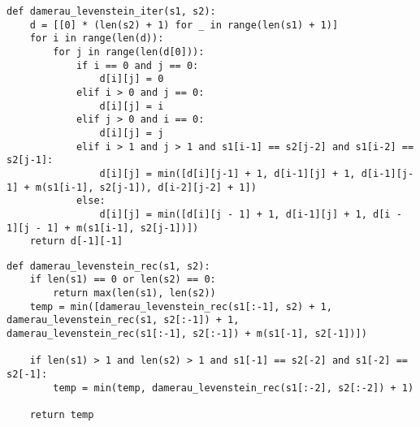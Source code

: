 \clearpage

\begin{lstlisting}[label=lst:dameray_lev_rec,caption=Функция нахождения расстояния Дамерау-Левенштейна с использованием матрицы]
def damerau_levenstein_iter(s1, s2):
	d = [[0] * (len(s2) + 1) for _ in range(len(s1) + 1)]
	for i in range(len(d)):
		for j in range(len(d[0])):
			if i == 0 and j == 0:
				d[i][j] = 0
			elif i > 0 and j == 0:
				d[i][j] = i
			elif j > 0 and i == 0:
				d[i][j] = j
			elif i > 1 and j > 1 and s1[i-1] == s2[j-2] and s1[i-2] == s2[j-1]:
				d[i][j] = min([d[i][j-1] + 1, d[i-1][j] + 1, d[i-1][j-1] + m(s1[i-1], s2[j-1]), d[i-2][j-2] + 1])
			else:
				d[i][j] = min([d[i][j - 1] + 1, d[i-1][j] + 1, d[i - 1][j - 1] + m(s1[i-1], s2[j-1])])
	return d[-1][-1]
\end{lstlisting}

\clearpage

\begin{lstlisting}[label=lst:dameray_lev_mtr,caption=Функция нахождения расстояния Дамерау-Левенштейна рекурсивно]
def damerau_levenstein_rec(s1, s2):
	if len(s1) == 0 or len(s2) == 0:
		return max(len(s1), len(s2))
	temp = min([damerau_levenstein_rec(s1[:-1], s2) + 1, damerau_levenstein_rec(s1, s2[:-1]) + 1, damerau_levenstein_rec(s1[:-1], s2[:-1]) + m(s1[-1], s2[-1])])

	if len(s1) > 1 and len(s2) > 1 and s1[-1] == s2[-2] and s1[-2] == s2[-1]:
		temp = min(temp, damerau_levenstein_rec(s1[:-2], s2[:-2]) + 1)

	return temp
\end{lstlisting}

\clearpage

